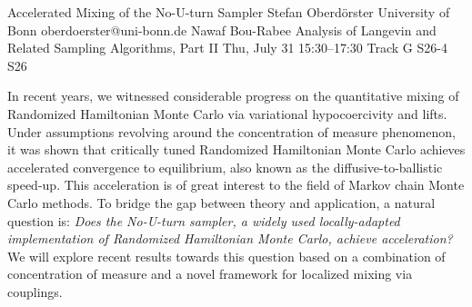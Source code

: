 \begin{talk}
\medskip


\end{talk}

\begin{talk}
  {Accelerated Mixing of the No-U-turn Sampler}%
  {Stefan Oberd\"orster}%
  {University of Bonn}%
  {oberdoerster@uni-bonn.de}%
  {Nawaf Bou-Rabee}%
  {Analysis of Langevin and Related Sampling Algorithms, Part II}%
  {Thu, July 31 15:30–17:30 Track G}%
  {S26-4}%
  {S26}%
				
			
In recent years, we witnessed considerable progress on the quantitative mixing of Randomized Hamiltonian Monte Carlo via variational hypocoercivity and lifts. Under assumptions revolving around the concentration of measure phenomenon, it was shown that critically tuned Randomized Hamiltonian Monte Carlo achieves accelerated convergence to equilibrium, also known as the diffusive-to-ballistic speed-up. This acceleration is of great interest to the field of Markov chain Monte Carlo methods. To bridge the gap between theory and application, a natural question is: {\it Does the No-U-turn sampler, a widely used locally-adapted implementation of Randomized Hamiltonian Monte Carlo, achieve acceleration?} We will explore recent results towards this question based on a combination of concentration of measure and a novel framework for localized mixing via couplings.

\end{talk}

